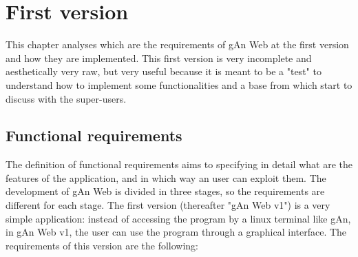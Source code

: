 
\chapter{First version} %

\label{Chapter4} %


This chapter analyses which are the requirements of gAn Web at the first version and how they are implemented. This first version is very incomplete and aesthetically very raw, but very useful because it is meant to be a "test" to understand how to implement some functionalities and a base from which start to discuss with the super-users. 

\section{Functional requirements}
The definition of functional requirements aims to specifying in detail what are the features of the application, and in which way an user can exploit them. The development of gAn Web is divided in three stages, so the requirements are different for each stage. The first version (thereafter "gAn Web v1") is a very simple application: instead of accessing the program by a linux terminal like gAn, in gAn Web v1, the user can use the program through a graphical interface. 
The requirements of this version are the following:

